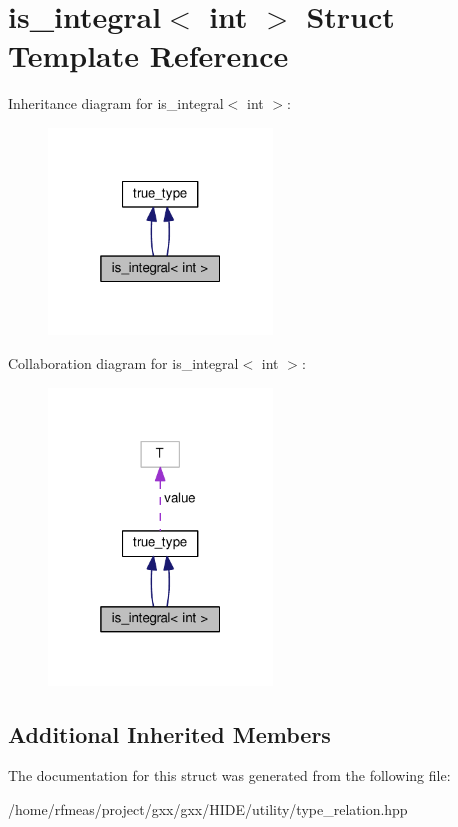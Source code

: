 \hypertarget{structis__integral_3_01int_01_4}{}\section{is\+\_\+integral$<$ int $>$ Struct Template Reference}
\label{structis__integral_3_01int_01_4}


Inheritance diagram for is\+\_\+integral$<$ int $>$\+:
\nopagebreak
\begin{figure}[H]
\begin{center}
\leavevmode
\includegraphics[width=169pt]{structis__integral_3_01int_01_4__inherit__graph}
\end{center}
\end{figure}


Collaboration diagram for is\+\_\+integral$<$ int $>$\+:
\nopagebreak
\begin{figure}[H]
\begin{center}
\leavevmode
\includegraphics[width=169pt]{structis__integral_3_01int_01_4__coll__graph}
\end{center}
\end{figure}
\subsection*{Additional Inherited Members}


The documentation for this struct was generated from the following file\+:\begin{DoxyCompactItemize}
\item 
/home/rfmeas/project/gxx/gxx/\+H\+I\+D\+E/utility/type\+\_\+relation.\+hpp\end{DoxyCompactItemize}
